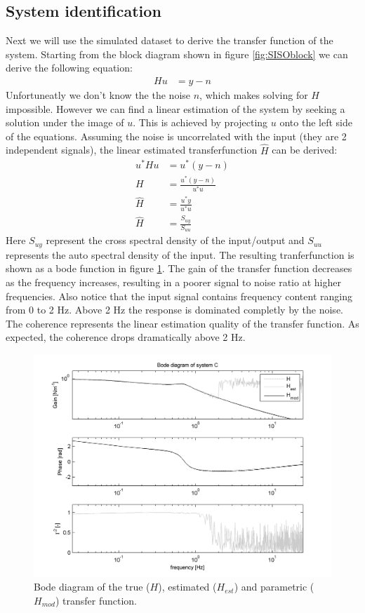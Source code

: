 \subsection{System identification}
Next we will use the simulated dataset to derive the transfer function of the system. Starting from the block diagram shown in figure \ref{fig:SISOblock} we can derive the following equation:
\begin{align}
		Hu & = y-n 
\end{align}
Unfortuneatly we don't know the the noise $n$, which makes solving for $H$ impossible. However we can find a linear estimation of the system by seeking a solution under the image of $u$. This is achieved by projecting $u$ onto the left side of the equations. Assuming the noise is uncorrelated with the input (they are 2  independent signals), the linear estimated transferfunction $\hat{H}$ can be derived:
\begin{align}
		u^\ast Hu & = u^\ast (y-n) \nonumber \\
		H 					& = \frac{u^\ast (y-n)}{u^\ast u}  \nonumber \\
		\hat{H}	& = \frac{u^\ast y}{u^\ast u} \nonumber \\
		\hat{H} 	& = \frac{S_{uy}}{S_{uu}}
		\label{eq:SISOH}
\end{align}
Here $S_{uy}$ represent the cross spectral density of the input/output and $S_{uu}$ represents the auto spectral density of the input. The resulting tranferfunction is shown as a bode function in figure \ref{fig:SISObode}. The gain of the transfer function decreases as the frequency increases, resulting in a poorer signal to noise ratio at higher frequencies. Also notice that the input signal contains frequency content ranging from 0 to 2 Hz. Above 2 Hz the response is dominated completly by the noise. The coherence represents the linear estimation quality of the transfer function. As expected, the coherence drops dramatically above 2 Hz.
	\begin{figure}
		\includegraphics{images/SISObode}
		\caption{Bode diagram of the true ($H$), estimated ($H_{est}$) and parametric ($H_{mod}$) transfer function.}
				\label{fig:SISObode}
	\end{figure}
